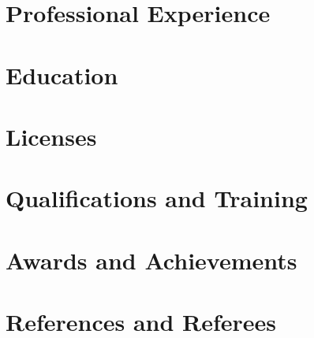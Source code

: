 \documentclass[10pt]{article}
\begin{document}
\section*{Professional Experience}


\section*{Education}


\section*{Licenses}


\section*{Qualifications and Training}


\section*{Awards and Achievements}


\section*{References and Referees}

\end{document}

